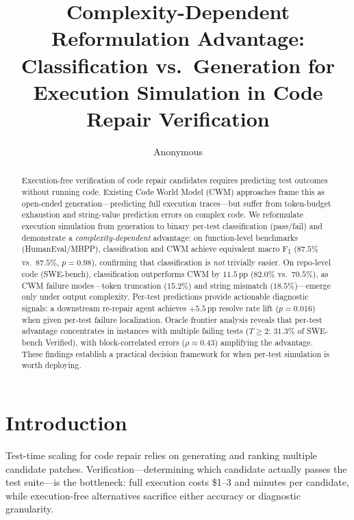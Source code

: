 \documentclass[11pt,a4paper]{article}
\title{Complexity-Dependent Reformulation Advantage:\\Classification vs.\ Generation for Execution Simulation in Code Repair Verification}
\author{Anonymous}
\newcommand{\fone}{F\textsubscript{1}}
\newcommand{\pp}{\,\text{pp}}
\begin{document}
\maketitle

\begin{abstract}
Execution-free verification of code repair candidates requires predicting test outcomes without running code.
Existing Code World Model (CWM) approaches frame this as open-ended generation---predicting full execution traces---but suffer from token-budget exhaustion and string-value prediction errors on complex code.
We reformulate execution simulation from generation to binary per-test classification (pass/fail) and demonstrate a \emph{complexity-dependent} advantage:
on function-level benchmarks (HumanEval/MBPP), classification and CWM achieve equivalent macro \fone{} ($87.5\%$ vs.\ $87.5\%$, $p{=}0.98$), confirming that classification is \emph{not} trivially easier.
On repo-level code (SWE-bench), classification outperforms CWM by $11.5\pp$ ($82.0\%$ vs.\ $70.5\%$), as CWM failure modes---token truncation ($15.2\%$) and string mismatch ($18.5\%$)---emerge only under output complexity.
Per-test predictions provide actionable diagnostic signals: a downstream re-repair agent achieves $+5.5\pp$ resolve rate lift ($p{=}0.016$) when given per-test failure localization.
Oracle frontier analysis reveals that per-test advantage concentrates in instances with multiple failing tests ($T{\geq}2$: $31.3\%$ of SWE-bench Verified), with block-correlated errors ($\rho{\approx}0.43$) amplifying the advantage.
These findings establish a practical decision framework for when per-test simulation is worth deploying.
\end{abstract}

\section{Introduction}

Test-time scaling for code repair relies on generating and ranking multiple candidate patches.
Verification---determining which candidate actually passes the test suite---is the bottleneck: full execution costs \$1--3 and minutes per candidate, while execution-free alternatives sacrifice either accuracy or diagnostic granularity.
\end{document}
